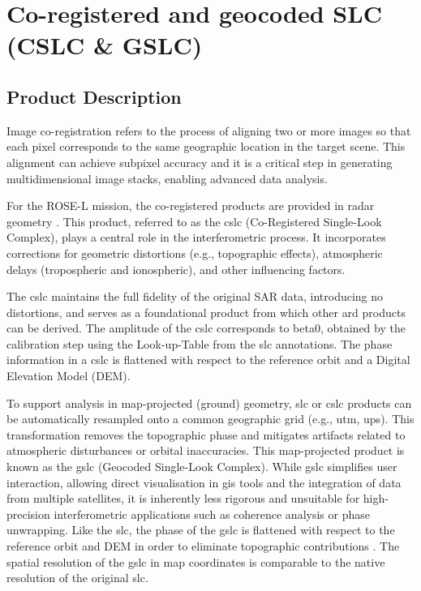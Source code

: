 \section{Co-registered and geocoded SLC (CSLC \& GSLC)}
\label{sec:cslc_gslc}

\subsection{Product Description}
\label{sec:cslc_product_description}
Image co-registration refers to the process of aligning two or more images so that each pixel corresponds to the same geographic location in the target scene. This alignment can achieve subpixel accuracy and it is a critical step in generating multidimensional image stacks, enabling advanced data analysis.

For the ROSE-L mission, the co-registered products are provided in radar geometry \cite{RD41}. This product, referred to as the \acs{cslc} (Co-Registered Single-Look Complex), plays a central role in the interferometric process. It incorporates corrections for geometric distortions (e.g., topographic effects), atmospheric delays (tropospheric and ionospheric), and other influencing factors. 

The \acs{cslc} maintains the full fidelity of the original SAR data, introducing no distortions, and serves as a foundational product from which other \acs{ard} products can be derived.
The amplitude of the \acs{cslc} corresponds to \gls{beta0}, obtained by the calibration step using the Look-up-Table from the \acs{slc} annotations.
The phase information in a \acs{cslc} is flattened with respect to the reference orbit and a Digital Elevation Model (DEM).

To support analysis in map-projected (ground) geometry, \acs{slc} or \acs{cslc} products can be automatically resampled onto a common geographic grid (e.g., \acs{utm}, \acs{ups}). This transformation removes the topographic phase and mitigates artifacts related to atmospheric disturbances or orbital inaccuracies. This map-projected product is known as the \acs{gslc} (Geocoded Single-Look Complex). While \acs{gslc} simplifies user interaction, allowing direct visualisation in \acs{gis} tools and the integration of data from multiple satellites, it is inherently less rigorous and unsuitable for high-precision interferometric applications such as coherence analysis or phase unwrapping.
Like the \acs{slc}, the phase of the \acs{gslc} is flattened with respect to the reference orbit and DEM in order to eliminate topographic contributions \cite{Zebker2017, Zheng2017}. The spatial resolution of the \acs{gslc} in map coordinates is comparable to the native resolution of the original \acs{slc}.

